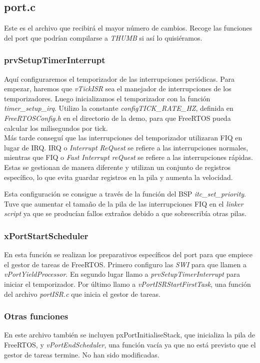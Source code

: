 \subsection{port.c}
Este es el archivo que recibirá el mayor número de cambios. Recoge las funciones del port que podrían compilarse a \emph{THUMB} si así lo quisiéramos. 

\subsubsection{prvSetupTimerInterrupt}
Aquí configuraremos el temporizador de las interrupciones periódicas. Para empezar, haremos que \emph{vTickISR} sea el manejador de interrupciones de los temporizadores. Luego inicializamos el temporizador con la función \emph{timer\_setup\_irq}. Utilizo la constante \emph{configTICK\_RATE\_HZ}, definida en \emph{FreeRTOSConfig.h} en el directorio de la demo, para que FreeRTOS pueda calcular los milisegundos por tick.\\

Más tarde conseguí que las interrupciones del temporizador utilizaran FIQ en lugar de IRQ. IRQ o \emph{Interrupt ReQuest} se refiere a las interrupciones normales, mientras que FIQ o \emph{Fast Interrupt reQuest} se refiere a las interrupciones rápidas. Estas se gestionan de manera diferente y utilizan un conjunto de registros específico, lo que evita guardar registros en la pila y aumenta la velocidad.

Esta configuración se consigue a través de la función del BSP \emph{itc\_set\_priority}. Tuve que aumentar el tamaño de la pila de las interrupciones FIQ en el \emph{linker script} ya que se producían fallos extraños debido a que sobrescribía otras pilas.

\subsubsection{xPortStartScheduler}
En esta función se realizan los preparativos específicos del port para que empiece el gestor de tareas de FreeRTOS. Primero configuro las \emph{SWI} para que llamen a \emph{vPortYieldProcessor}. En segundo lugar llamo a \emph{prvSetupTimerInterrupt} para iniciar el temporizador. Por último llamo a \emph{vPortISRStartFirstTask}, una función del archivo \emph{portISR.c} que inicia el gestor de tareas.

\subsubsection{Otras funciones}
En este archivo también se incluyen pxPortInitialiseStack, que inicializa la pila de FreeRTOS, y \emph{vPortEndScheduler}, una función vacía ya que no está previsto que el gestor de tareas termine. No han sido modificadas.

